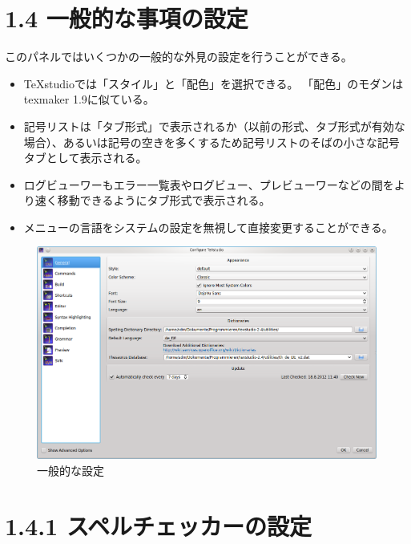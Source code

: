 \documentclass[]{book}
\makeatletter
\def\maxwidth{\ifdim\Gin@nat@width>\linewidth\linewidth
\else\Gin@nat@width\fi}
\let\Oldincludegraphics\includegraphics
\renewcommand{\includegraphics}[1]{\Oldincludegraphics[width=\maxwidth]{#1}}
\makeatother
\begin{document}
\section{1.4 一般的な事項の設定}

このパネルではいくつかの一般的な外見の設定を行うことができる。

\begin{itemize}
\item
  TeXstudioでは「スタイル」と「配色」を選択できる。
  「配色」のモダンはtexmaker 1.9に似ている。
\item
  記号リストは「タブ形式」で表示されるか（以前の形式、タブ形式が有効な場合）、あるいは記号の空きを多くするため記号リストのそばの小さな記号タブとして表示される。
\item
  ログビューワーもエラー一覧表やログビュー、プレビューワーなどの間をより速く移動できるようにタブ形式で表示される。
\item
  メニューの言語をシステムの設定を無視して直接変更することができる。
\end{itemize}

\begin{figure}[htbp]
\centering
\includegraphics{configure_general.png}
\caption{一般的な設定}
\end{figure}

\section{1.4.1 スペルチェッカーの設定}
\end{document}
